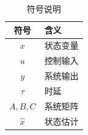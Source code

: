 \begin{table}[htbp]
\centering
\caption{符号说明}
\label{tab:symbols}
\begin{tabular}{@{}cl@{}}
\toprule
\textbf{符号} & \textbf{含义} \\
\midrule
$x$ & 状态变量 \\
$u$ & 控制输入 \\
$y$ & 系统输出 \\
$\tau$ & 时延 \\
$A, B, C$ & 系统矩阵 \\
$\hat{x}$ & 状态估计 \\
\bottomrule
\end{tabular}
\end{table}
